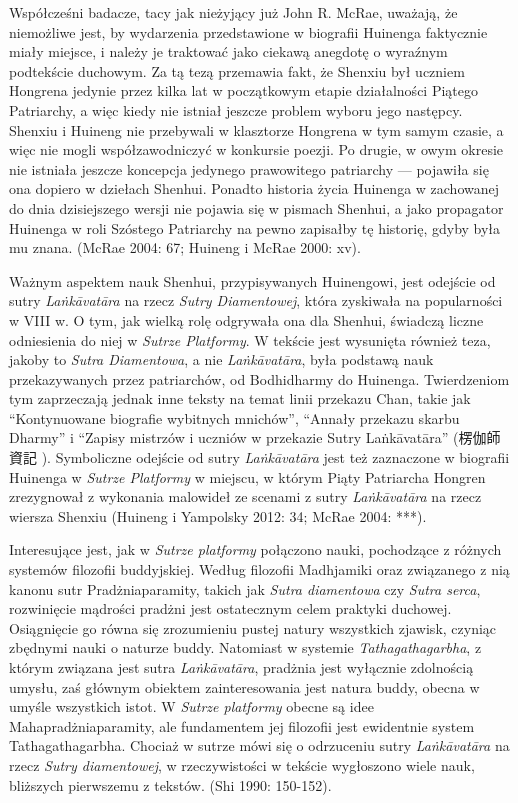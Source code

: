 Współcześni badacze, tacy jak nieżyjący już John R. McRae, uważają, że niemożliwe jest, by wydarzenia przedstawione w biografii Huinenga faktycznie miały miejsce, i należy je traktować jako ciekawą anegdotę o wyraźnym podtekście duchowym. Za tą tezą przemawia fakt, że Shenxiu był uczniem Hongrena jedynie przez kilka lat w początkowym etapie działalności Piątego Patriarchy, a więc kiedy nie istniał jeszcze problem wyboru jego następcy. Shenxiu i Huineng nie przebywali w klasztorze Hongrena w tym samym czasie, a więc nie mogli współzawodniczyć w konkursie poezji. Po drugie, w owym okresie nie istniała jeszcze koncepcja jedynego prawowitego patriarchy --- pojawiła się ona dopiero w dziełach Shenhui. Ponadto historia życia Huinenga w zachowanej do dnia dzisiejszego wersji nie pojawia się w pismach Shenhui, a jako propagator Huinenga w roli Szóstego Patriarchy na pewno zapisałby tę historię, gdyby była mu znana. (McRae 2004: 67; Huineng i McRae 2000: xv).

Ważnym aspektem nauk Shenhui, przypisywanych Huinengowi, jest odejście od sutry \textit{La\.nkā\-vatāra} na rzecz \textit{Sutry Diamentowej}, która zyskiwała na popularności w VIII w.
O tym, jak wielką rolę odgrywała ona dla Shenhui, świadczą liczne odniesienia do niej w \textit{Sutrze Platformy}.
W tekście jest wysunięta również teza, jakoby to \textit{Sutra Diamentowa}, a nie \textit{La\.nkāvatāra}, była podstawą nauk przekazywanych przez patriarchów, od Bodhidharmy do Huinenga.
Twierdzeniom tym zaprzeczają jednak inne teksty na temat linii przekazu Chan, takie jak ``Kontynuowane biografie wybitnych mnichów'', ``Annały przekazu skarbu Dharmy'' i ``Zapisy mistrzów i uczniów w przekazie Sutry La\.nkāvatāra'' (楞伽師資記 ).
Symboliczne odejście od sutry \textit{La\.nkāvatāra} jest też zaznaczone w biografii Huinenga w \textit{Sutrze Platformy} w miejscu, w którym Piąty Patriarcha Hongren zrezygnował z wykonania malowideł ze scenami z sutry \textit{La\.nkāvatāra} na rzecz wiersza Shenxiu (Huineng i Yampolsky 2012: 34; McRae 2004: ***).

Interesujące jest, jak w \textit{Sutrze platformy} połączono nauki, pochodzące z różnych systemów filozofii buddyjskiej.
Według filozofii Madhjamiki oraz związanego z nią kanonu sutr Pradżniaparamity, takich jak \textit{Sutra diamentowa} czy \textit{Sutra serca}, rozwinięcie mądrości pradżni jest ostatecznym celem praktyki duchowej.
Osiągnięcie go równa się zrozumieniu pustej natury wszystkich zjawisk, czyniąc zbędnymi nauki o naturze buddy.
Natomiast w systemie \textit{Tathagathagarbha}, z którym związana jest sutra \textit{La\.nkā\-vatāra}, pradżnia jest wyłącznie zdolnością umysłu, zaś głównym obiektem zainteresowania jest natura buddy, obecna w umyśle wszystkich istot.
W \textit{Sutrze platformy} obecne są idee Mahapradżniaparamity, ale fundamentem jej filozofii jest ewidentnie system Tathagathagarbha.
Chociaż w sutrze mówi się o odrzuceniu sutry \textit{La\.nkā\-vatāra} na rzecz \textit{Sutry diamentowej}, w rzeczywistości w tekście wygłoszono wiele nauk, bliższych pierwszemu z tekstów.
(Shi 1990: 150-152).

